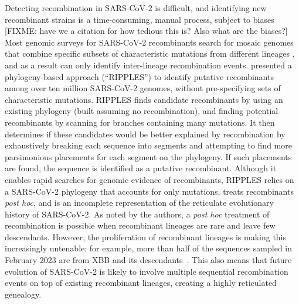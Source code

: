 \documentclass{article}
\begin{document}
Detecting recombination in SARS-CoV-2 is difficult, and identifying new
recombinant strains is a time-consuming, manual process, subject
to biases [FIXME: have we a citation for how tedious this is? Also what
are the biases?]
Most genomic surveys for SARS-CoV-2 recombinants search for mosaic genomes that
combine specific subsets of characteristic mutations from different lineages
\citep[e.g.][]{VanInsberghe2021-eu,Jackson2021-ik,Wertheim2022-hj,Sekizuka2022-xz},
and as a result can only identify inter-lineage recombination events.
\cite{Turakhia2022-it} presented a
phylogeny-based approach (``RIPPLES'') to identify putative recombinants among
over ten million SARS-CoV-2 genomes, without pre-specifying sets of characteristic
mutations.
RIPPLES finds candidate recombinants by using an existing phylogeny
(built assuming no recombination), and finding potential recombinants
by  scanning for branches containing many mutations.
It then determines if these candidates would be better explained by
recombination by exhaustively breaking each
sequence into segments and attempting to find more parsimonious placements for
each segment on the phylogeny. If such placements are found, the sequence is
identified as a putative recombinant. Although it enables rapid searches for
genomic evidence of recombinants, RIPPLES relies on a SARS-CoV-2 phylogeny that
accounts for only mutations, treats recombinants \textit{post hoc}, and is an
incomplete representation of the reticulate evolutionary history of SARS-CoV-2.
As noted by the authors, a \textit{post hoc} treatment of recombination is
possible when recombinant lineages are rare and leave few descendants. However,
the proliferation of recombinant lineages is making this increasingly
untenable; for example, more than half of the sequences sampled in February 2023
are from XBB and its descendants~\citep{Chen2022-pz}. This also means that
future evolution of SARS-CoV-2 is likely to involve multiple sequential
recombination events on top of existing recombinant lineages, creating a highly
reticulated genealogy.

\end{document}
